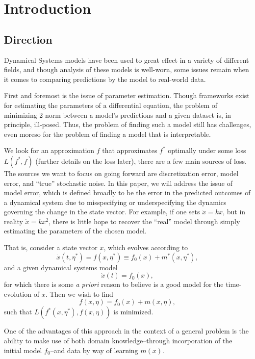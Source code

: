 \documentclass[12pt]{article}
\begin{document}
\section{Introduction}

\subsection{Direction}

Dynamical Systems models have been used to great effect in a variety of different fields, and though analysis of these models is well-worn, some issues remain when it comes to comparing predictions by the model to real-world data.

First and foremost is the issue of parameter estimation. Though frameworks exist for estimating the parameters of a differential equation, the problem of minimizing 2-norm between a model's predictions and a given dataset is, in principle, ill-posed\cite{chung}. Thus, the problem of finding such a model still has challenges, even moreso for the problem of finding a model that is interpretable.

We look for an approximation $f$ that approximates $f^*$ optimally under some loss $L(f^*, f)$ (further details on the loss later), there are a few main sources of loss. The sources we want to focus on going forward are discretization error, model error, and ``true'' stochastic noise. In this paper, we will address the issue of model error, which is defined broadly to be the error in the predicted outcomes of a dynamical system due to misspecifying or underspecifying the dynamics governing the change in the state vector. For example, if one sets $\dot{x} = k x$, but in reality $\dot{x} = k x^2$, there is little hope to recover the ``real'' model through simply estimating the parameters of the chosen model.

That is, consider a state vector $x$, which evolves according to $$\dot{x}(t, \eta^*) = f(x, \eta^*) \equiv f_0(x) + m^*(x, \eta^*),$$ and a given dynamical systems model $$\dot{x}(t) = f_0(x),$$ for which there is some \textit{a priori} reason to believe is a good model for the time-evolution of $x$. Then we wish to find $$f(x, \eta) = f_0(x) + m(x, \eta),$$ such that $L(f^*(x, \eta^*), f(x, \eta))$ is minimized.

One of the advantages of this approach in the context of a general problem is the ability to make use of both domain knowledge\---through incorporation of the initial model $f_0$\---and data by way of learning $m(x)$\cite{levine}.
\end{document}
